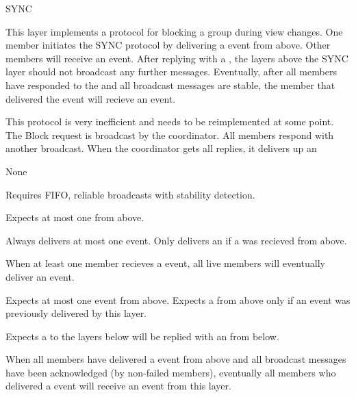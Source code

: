 %
%
%
\begin{Layer}{SYNC}

This layer implements a protocol for blocking a group during view changes.  One
member initiates the SYNC protocol by delivering a  event from above.
Other members will receive an  event.  After replying with a
, the layers above the SYNC layer should not broadcast any further
messages.  Eventually, after all members have responded to the  and
all broadcast messages are stable, the member that delivered the 
event will recieve an  event.

\begin{Protocol}
This protocol is very inefficient and needs to be reimplemented at some
point.  The Block request is broadcast by the coordinator.  All members
respond with another broadcast.  When the coordinator gets all replies, it
delivers up an 
\end{Protocol}

\begin{Parameters}
\item None
\end{Parameters}

\begin{Properties}
\item
Requires FIFO, reliable broadcasts with stability detection.
\item
Expects at most one  from above.
\item
Always delivers at most one  event.  Only delivers an
 if a  was recieved from above.
\item
When at least one member recieves a  event, all live members will
eventually deliver an  event.
\item
Expects at most one  event from above.  Expects a  from
above only if an  event was previously delivered by this layer.
\item
Expects a  to the layers below will be replied with an  from
below.
\item
When all members have delivered a  event from above and all
broadcast messages have been acknowledged (by non-failed members),
eventually all members who delivered a  event will receive an
 event from this layer.
\end{Properties}


\end{Layer}
